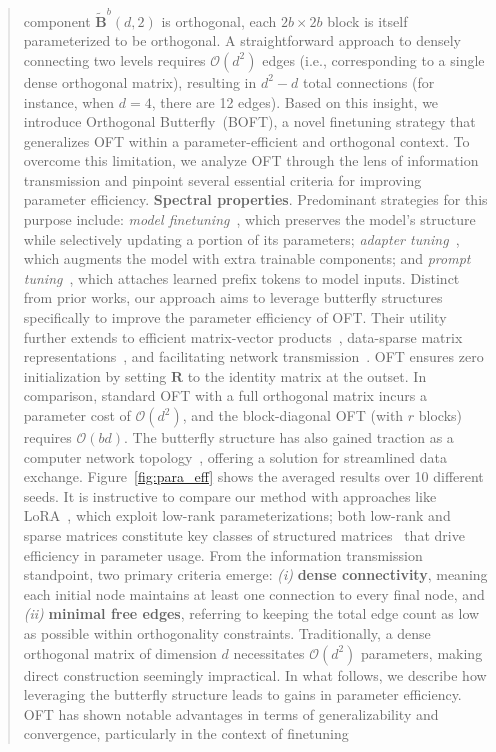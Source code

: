 \begin{itemize}[leftmargin=*,nosep]
\begin{theorem}
\begin{abstract}
component $\tilde{\bm{B}}^b(d,2)$ is orthogonal, each $2b\times 2b$ block is itself parameterized to be orthogonal. A straightforward approach to densely connecting two levels requires $\mathcal{O}(d^2)$ edges (i.e., corresponding to a single dense orthogonal matrix), resulting in $d^2-d$ total connections (for instance, when $d=4$, there are 12 edges). Based on this insight, we introduce Orthogonal Butterfly~(BOFT), a novel finetuning strategy that generalizes OFT within a parameter-efficient and orthogonal context. To overcome this limitation, we analyze OFT through the lens of information transmission and pinpoint several essential criteria for improving parameter efficiency. \textbf{Spectral properties}. Predominant strategies for this purpose include: \emph{model finetuning}~\cite{hulora2022,zaken2022bitfit,guo2020parameter,raffel2020exploring,qiu2023controlling,zhang2022adaptive,chavan2023one}, which preserves the model’s structure while selectively updating a portion of its parameters; \emph{adapter tuning}~\cite{rebuffi2017learning,houlsby2019parameter,pfeiffer2020adapterfusion,lin2020exploring,he2021towards}, which augments the model with extra trainable components; and \emph{prompt tuning}~\cite{li2021prefix,lester2021power}, which attaches learned prefix tokens to model inputs. Distinct from prior works, our approach aims to leverage butterfly structures specifically to improve the parameter efficiency of OFT. Their utility further extends to efficient matrix-vector products~\cite{michielssen1996multilevel,o2010algorithm}, data-sparse matrix representations~\cite{li2015butterfly}, and facilitating network transmission~\cite{klasing1994broadcasting,li2003linear,rajasingh2016transmission}. OFT ensures zero initialization by setting $\bm{R}$ to the identity matrix at the outset. In comparison, standard OFT with a full orthogonal matrix incurs a parameter cost of $\mathcal{O}(d^2)$, and the block-diagonal OFT (with $r$ blocks) requires $\mathcal{O}(bd)$. The butterfly structure has also gained traction as a computer network topology~\cite{solihin2015fundamentals,li2011linear}, offering a solution for streamlined data exchange. Figure~\ref{fig:para_eff} shows the averaged results over 10 different seeds. It is instructive to compare our method with approaches like LoRA~\cite{hulora2022}, which exploit low-rank parameterizations; both low-rank and sparse matrices constitute key classes of structured matrices~\cite{candes2011robust} that drive efficiency in parameter usage. From the information transmission standpoint, two primary criteria emerge: \emph{(i)} \textbf{dense connectivity}, meaning each initial node maintains at least one connection to every final node, and \emph{(ii)} \textbf{minimal free edges}, referring to keeping the total edge count as low as possible within orthogonality constraints. Traditionally, a dense orthogonal matrix of dimension $d$ necessitates $\mathcal{O}(d^2)$ parameters, making direct construction seemingly impractical. In what follows, we describe how leveraging the butterfly structure leads to gains in parameter efficiency. OFT has shown notable advantages in terms of generalizability and convergence, particularly in the context of finetuning 
\end{abstract}
\end{theorem}
\end{itemize}
